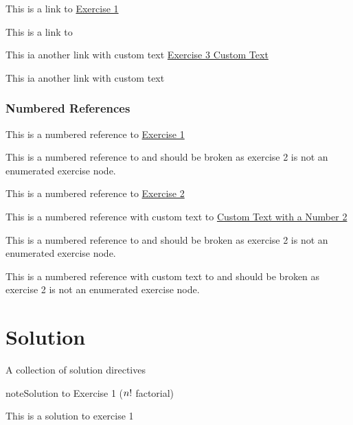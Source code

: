 \sphinxAtStartPar
This is a link to \hyperref[exercise:exercise-1]{Exercise 1}

\sphinxAtStartPar
This is a link to {\hyperref[\detokenize{exercise:exercise-2}]{}}

\sphinxAtStartPar
This ia another link with custom text \hyperref[exercise:exercise-3]{Exercise 3 Custom Text}

\sphinxAtStartPar
This ia another link with custom text {\hyperref[\detokenize{exercise:exercise-4}]{}}


\subsection{Numbered References}
\label{\detokenize{exercise:numbered-references}}
\sphinxAtStartPar
This is a numbered reference to \hyperref[exercise:exercise-1]{Exercise 1}

\sphinxAtStartPar
This is a numbered reference to  and should be broken as exercise 2 is not an
enumerated exercise node.

\sphinxAtStartPar
This is a numbered reference to \hyperref[exercise:exercise-3]{Exercise 2}

\sphinxAtStartPar
This is a numbered reference with custom text to \hyperref[exercise:exercise-3]{Custom Text with a Number 2}

\sphinxAtStartPar
This is a numbered reference to  and should be broken as exercise 2 is not an
enumerated exercise node.

\sphinxAtStartPar
This is a numbered reference with custom text to  and should be broken as exercise 2 is not an
enumerated exercise node.


\chapter{Solution}
\label{\detokenize{solution:solution}}\label{\detokenize{solution::doc}}
\sphinxAtStartPar
A collection of solution directives
 \label{solution:solution-1}

\begin{sphinxadmonition}{note}{Solution to Exercise 1 (\protect\(n!\protect\) factorial)}



\sphinxAtStartPar
This is a solution to exercise 1
\end{sphinxadmonition}
 \label{solution:solution-2}


